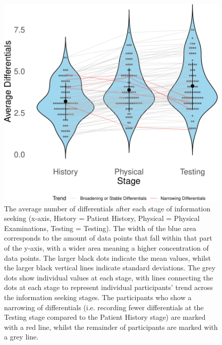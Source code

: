\documentclass[a4paper, nobind]{templates/ociamthesis}
\begin{document}
\newpage

\begin{figure}[H]

{\centering \includegraphics[width=1\linewidth]{_main_files/figure-latex/diffsOverStages-1} 

}

\caption{The average number of differentials after each stage of information seeking (x-axis, History = Patient History, Physical = Physical Examinations, Testing = Testing). The width of the blue area corresponds to the amount of data points that fall within that part of the y-axis, with a wider area meaning a higher concentration of data points. The larger black dots indicate the mean values, whilst the larger black vertical lines indicate standard deviations. The grey dots show individual values at each stage, with lines connecting the dots at each stage to represent individual participants' trend across the information seeking stages. The participants who show a narrowing of differentials (i.e. recording fewer differentials at the Testing stage compared to the Patient History stage) are marked with a red line, whilst the remainder of participants are marked with a grey line.}\label{fig:diffsOverStages}
\end{figure}
\end{document}
